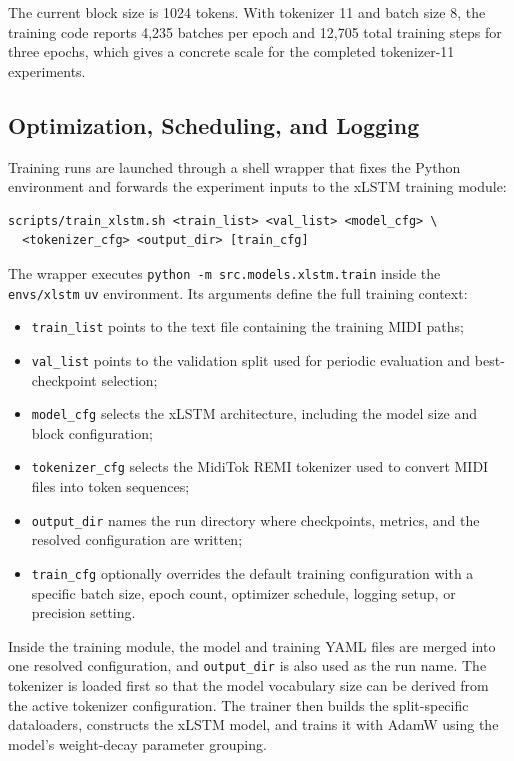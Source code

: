 The current block size is 1024 tokens. With tokenizer 11 and batch size 8, the training code reports 4,235 batches per epoch and 12,705 total training steps for three epochs, which gives a concrete scale for the completed tokenizer-11 experiments.

\subsection{Optimization, Scheduling, and Logging}

Training runs are launched through a shell wrapper that fixes the Python environment and forwards the experiment inputs to the xLSTM training module:
\begin{verbatim}
scripts/train_xlstm.sh <train_list> <val_list> <model_cfg> \
  <tokenizer_cfg> <output_dir> [train_cfg]
\end{verbatim}

The wrapper executes \verb|python -m src.models.xlstm.train| inside the \verb|envs/xlstm| \verb|uv| environment. Its arguments define the full training context:
\begin{itemize}
	\item \verb|train_list| points to the text file containing the training MIDI paths;
	\item \verb|val_list| points to the validation split used for periodic evaluation and best-checkpoint selection;
	\item \verb|model_cfg| selects the xLSTM architecture, including the model size and block configuration;
	\item \verb|tokenizer_cfg| selects the MidiTok REMI tokenizer used to convert MIDI files into token sequences;
	\item \verb|output_dir| names the run directory where checkpoints, metrics, and the resolved configuration are written;
	\item \verb|train_cfg| optionally overrides the default training configuration with a specific batch size, epoch count, optimizer schedule, logging setup, or precision setting.
\end{itemize}

Inside the training module, the model and training YAML files are merged into one resolved configuration, and \verb|output_dir| is also used as the run name. The tokenizer is loaded first so that the model vocabulary size can be derived from the active tokenizer configuration. The trainer then builds the split-specific dataloaders, constructs the xLSTM model, and trains it with AdamW \citep{loshchilovDecoupledWeightDecay2019} using the model's weight-decay parameter grouping.


